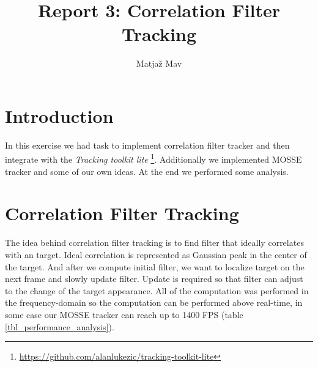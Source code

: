 \documentclass[runningheads]{llncs}
\begin{document}
% 
\title{Report 3: Correlation Filter Tracking}
\author{Matjaž Mav}
%
\maketitle
%
 
\section{Introduction}
In this exercise we had task to implement correlation filter tracker and then integrate with the \textit{Tracking toolkit lite} \footnote{\url{https://github.com/alanlukezic/tracking-toolkit-lite}}. Additionally we implemented MOSSE tracker and some of our own ideas. At the end we performed some analysis.

\section{Correlation Filter Tracking}
The idea behind correlation filter tracking is to find filter that ideally correlates with an target. Ideal correlation is represented as Gaussian peak in the center of the target. And after we compute initial filter, we want to localize target on the next frame and slowly update filter. Update is required so that filter can adjust to the change of the target appearance. All of the computation was performed in the frequency-domain so the computation can be performed above real-time, in some case our MOSSE tracker can reach up to 1400 FPS (table \ref{tbl_performance_analysis}).
\end{document}
